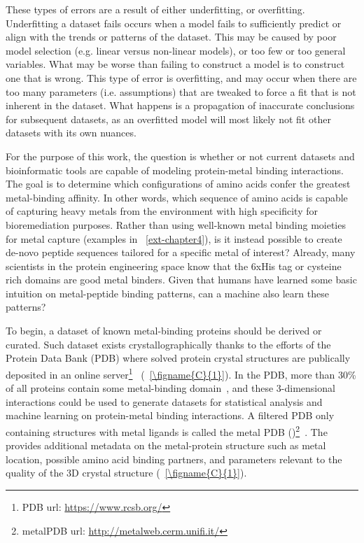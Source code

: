 \documentclass[../main/main]{subfiles}
\begin{document}
These types of errors are a result of either underfitting, or overfitting. Underfitting a dataset fails occurs when a model fails to sufficiently predict or align with the trends or patterns of the dataset. This may be caused by poor model selection (e.g. linear versus non-linear models), or too few or too general variables. What may be worse than failing to construct a model is to construct one that is wrong. This type of error is overfitting, and may occur when there are too many parameters (i.e. assumptions) that are tweaked to force a fit that is not inherent in the dataset. What happens is a propagation of inaccurate conclusions for subsequent datasets, as an overfitted model will most likely not fit other datasets with its own nuances.

For the purpose of this work, the question is whether or not current datasets and bioinformatic tools are capable of modeling protein-metal binding interactions. The goal is to determine which configurations of amino acids confer the greatest metal-binding affinity. In other words, which sequence of amino acids is capable of capturing heavy metals from the environment with high specificity for bioremediation purposes. Rather than using well-known metal binding moieties for metal capture (examples in \CHAPTER~\ref{ext-chapter4}), is it instead possible to create de-novo peptide sequences tailored for a specific metal of interest? Already, many scientists in the protein engineering space know that the 6xHis tag or cysteine rich domains are good metal binders. Given that humans have learned some basic intuition on metal-peptide binding patterns, can a machine also learn these patterns?

To begin, a dataset of known metal-binding proteins should be derived or curated. Such dataset exists crystallographically thanks to the efforts of the Protein Data Bank (PDB) where solved protein crystal structures are publically deposited in an online server\footnote{
	PDB url: \url{https://www.rcsb.org/}
}~\cite{berman2008}
(\FIGURE~\ref{\figname{C}{1}}). In the PDB, more than 30\% of all proteins contain some metal-binding domain~\cite{waldron2009}, and these 3-dimensional interactions could be used to generate datasets for statistical analysis and machine learning on protein-metal binding interactions. A filtered PDB only containing structures with metal ligands is called the metal PDB (\mPDB{})\footnote{
	metalPDB url: \url{http://metalweb.cerm.unifi.it/}
}~\cite{andreini2013}.
The \mPDB{} provides additional metadata on the metal-protein structure such as metal location, possible amino acid binding partners, and parameters relevant to the quality of the 3D crystal structure (\FIGURE~\ref{\figname{C}{1}}).
\end{document}
